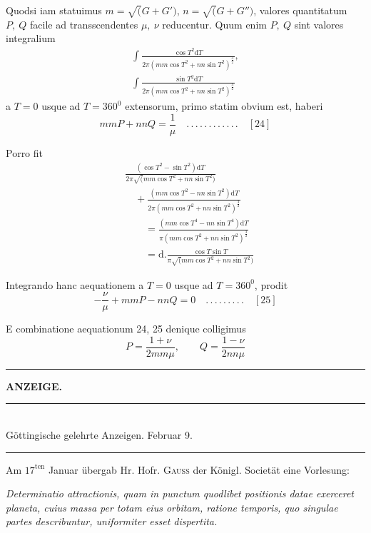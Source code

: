 Quodsi iam statuimus $m=\surd(G+G')$, $n=\surd(G+G'')$, valores quantitatum $P,\ Q$ facile ad transscendentes $\mu,\ \nu$ reducentur. Quum enim $P,\ Q$ sint
valores integralium
\[
\begin{gathered}\int\frac{\cos T^2\mathrm{d}T}{2\pi(mm\cos T^2+nn\sin T^2)^{\frac32}},\\[7pt]\int\frac{\sin T^2\mathrm{d}T}{2\pi(mm\cos T^2+nn\sin T^2)^{\frac32}}\end{gathered}
\]
a $T=0$ usque ad $T=360^{0}$ extensorum, primo statim obvium est, haberi
\[
mmP+nnQ=\frac{1}{\mu}\quad .\, .\, .\, .\, .\, .\, .\, .\, .\, .\, .\, .\quad[24]
\]
\par Porro fit
\[
\begin{aligned}
&\frac{(\cos T^2-\sin T^2)\mathrm{d}T}{2\pi\surd(mm\cos T^2+nn\sin T^2)}\\[7pt]&\quad+\frac{(mm\cos T^2-nn\sin T^2)\mathrm{d}T}{2\pi(mm\cos T^2+nn\sin T^2)^{\frac32}}\\[6pt]
&\qquad=\frac{(mm\cos T^4-nn\sin T^4)\mathrm{d}T}{\pi(mm\cos T^2+nn\sin T^2)^{\frac32}}\\[6pt]
&\qquad=\mathrm{d}.\frac{\cos T\sin T}{\pi\surd(mm\cos T^2+nn\sin T^2)}
\end{aligned}
\]
\par Integrando hanc aequationem a $T=0$ usque ad $T=360^{0}$, prodit
\[
-\frac{\nu}{\mu}+mmP-nnQ=0\quad .\, .\, .\, .\, .\, .\, .\, .\, .\quad[25]
\]
\par E combinatione aequationum 24, 25 denique colligimus
\[
P=\frac{1+\nu}{2mm\mu},\qquad Q=\frac{1-\nu}{2nn\mu}
\]
\begin{center}\rule{0.22\textwidth}{0.4pt}\end{center}
\clearpage{}
\begin{center}
\textbf{ANZEIGE.}
\end{center}
\begin{center}
\rule{0.62\linewidth}{0.4pt}\\[6pt]
Göttingische gelehrte Anzeigen. Februar 9.\\[6pt]
\rule{0.62\linewidth}{0.4pt}
\end{center}

Am $17^{\mathrm{ten}}$ Januar übergab Hr. Hofr. \textsc{Gauss} der Königl. Societät eine Vorlesung:

\begin{center}
\textit{Determinatio attractionis, quam in punctum quodlibet positionis datae exerceret
planeta, cuius massa per totam eius orbitam, ratione temporis, quo singulae partes
describuntur, uniformiter esset dispertita.}
\end{center}

